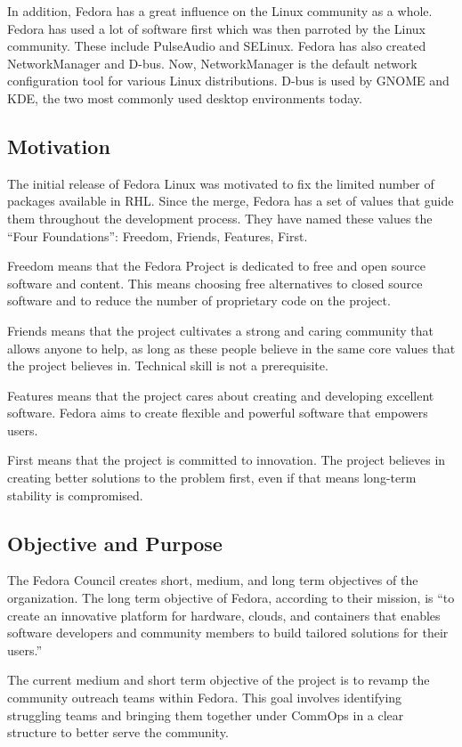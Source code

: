 \documentclass{article}
\begin{document}
In addition, Fedora has a great influence on the Linux community as a whole.
Fedora has used a lot of software first which was then parroted by the Linux
community. These include PulseAudio and SELinux. Fedora has also created
NetworkManager and D-bus. Now, NetworkManager is the default network
configuration tool for various Linux distributions. D-bus is used by GNOME and
KDE, the two most commonly used desktop environments today.

\subsection{Motivation}
The initial release of Fedora Linux was motivated to fix the limited number of
packages available in RHL. Since the merge, Fedora has a set of values that
guide them throughout the development process. They have named these values the
“Four Foundations”: Freedom, Friends, Features, First.

Freedom means that the Fedora Project is dedicated to free and open source
software and content. This means choosing free alternatives to closed source
software and to reduce the number of proprietary code on the project.

Friends means that the project cultivates a strong and caring community that
allows anyone to help, as long as these people believe in the same core values
that the project believes in. Technical skill is not a prerequisite.

Features means that the project cares about creating and developing excellent
software. Fedora aims to create flexible and powerful software that empowers
users.

First means that the project is committed to innovation. The project believes in
creating better solutions to the problem first, even if that means long-term
stability is compromised. \parencite{fedora_mission}

\subsection{Objective and Purpose}
The Fedora Council creates short, medium, and long term objectives of the
organization. The long term objective of Fedora, according to their mission, is
“to create an innovative platform for hardware, clouds, and containers that
enables software developers and community members to build tailored solutions
for their users.” \parencite{fedora_mission}

The current medium and short term objective of the project is to revamp the
community outreach teams within Fedora. This goal involves identifying
struggling teams and bringing them together under CommOps in a clear structure
to better serve the community.
\end{document}
